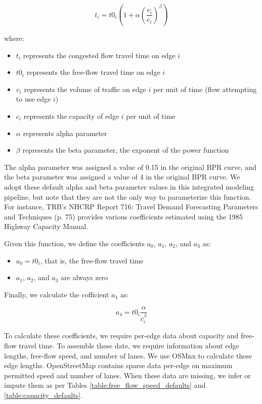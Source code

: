\bigskip
\begin{equation}
    t_i = t0_i (1 + \alpha (\frac{v_i}{c_i}) ^ \beta)
    \label{eq:bpr_function}
\end{equation}

\bigskip
where:

\bigskip
\begin{itemize}
    \item $t_i$ represents the congested flow travel time on edge $i$
    \item $t0_i$ represents the free-flow travel time on edge $i$
    \item $v_i$ represents the volume of traffic on edge $i$ per unit of time (flow attempting to use edge $i$)
    \item $c_i$ represents the capacity of edge $i$ per unit of time
    \item $\alpha$ represents alpha parameter
    \item $\beta$ represents the beta parameter, the exponent of the power function
\end{itemize}

\bigskip
The alpha parameter was assigned a value of 0.15 in the original BPR curve, and the beta parameter was assigned a value of 4 in the original BPR curve. We adopt these default alpha and beta parameter values in this integrated modeling pipeline, but note that they are not the only way to parameterize this function. For instance, TRB's NHCRP Report 716: Travel Demand Forecasting Parameters and Techniques (p. 75) provides various coefficients estimated using the 1985 Highway Capacity Manual.

\bigskip
Given this function, we define the coefficients $a_0$, $a_1$, $a_2$, and $a_3$ as:

\bigskip
\begin{itemize}
    \item $a_0 = t0_i$, that is, the free-flow travel time
    \item $a_1$, $a_2$, and $a_3$ are always zero
\end{itemize}

\bigskip
Finally, we calculate the cofficient $a_4$ as:

\begin{equation}
    a_4 = t0_i \frac{\alpha}{c_i ^ {\beta}}
    \label{eq:bpr_a4_coefficient}
\end{equation}

To calculate these coefficients, we require per-edge data about capacity and free-flow travel time. To assemble these date, we require information about edge lengths, free-flow speed, and number of lanes. We use OSMnx to calculate these edge lengths. OpenStreetMap contains sparse data per-edge on maximum permitted speed and number of lanes. When these data are missing, we infer or impute them as per Tables \ref{table:free_flow_speed_defaults} and \ref{table:capacity_defaults}.

